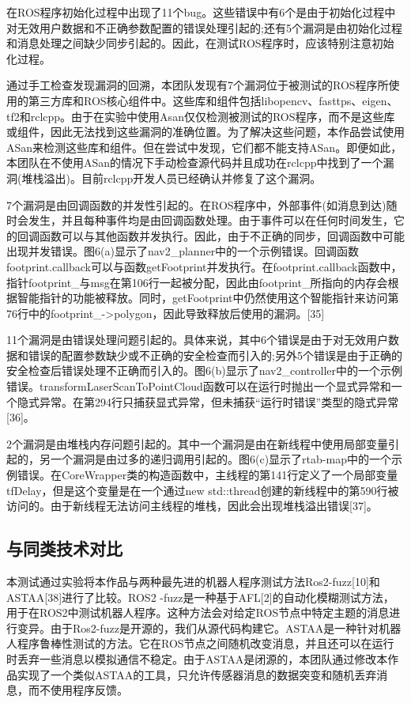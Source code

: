 在ROS程序初始化过程中出现了11个bug。这些错误中有6个是由于初始化过程中对无效用户数据和不正确参数配置的错误处理引起的;还有5个漏洞是由初始化过程和消息处理之间缺少同步引起的。因此，在测试ROS程序时，应该特别注意初始化过程。

通过手工检查发现漏洞的回溯，本团队发现有7个漏洞位于被测试的ROS程序所使用的第三方库和ROS核心组件中。这些库和组件包括libopencv、fasttps、eigen、tf2和rclcpp。由于在实验中使用Asan仅仅检测被测试的ROS程序，而不是这些库或组件，因此无法找到这些漏洞的准确位置。为了解决这些问题，本作品尝试使用ASan来检测这些库和组件。但在尝试中发现，它们都不能支持ASan。即便如此，本团队在不使用ASan的情况下手动检查源代码并且成功在rclcpp中找到了一个漏洞(堆栈溢出)。目前rclcpp开发人员已经确认并修复了这个漏洞。

7个漏洞是由回调函数的并发性引起的。在ROS程序中，外部事件(如消息到达)随时会发生，并且每种事件均是由回调函数处理。由于事件可以在任何时间发生，它的回调函数可以与其他函数并发执行。因此，由于不正确的同步，回调函数中可能出现并发错误。图6(a)显示了nav2\_planner中的一个示例错误。回调函数footprint.callback可以与函数getFootprint并发执行。在footprint.callback函数中，指针footprint\_与msg在第106行一起被分配，因此由footprint\_所指向的内存会根据智能指针的功能被释放。同时，getFootprint中仍然使用这个智能指针来访问第76行中的footprint\_-\textgreater polygon，因此导致释放后使用的漏洞。{[}35{]}

11个漏洞是由错误处理问题引起的。具体来说，其中6个错误是由于对无效用户数据和错误的配置参数缺少或不正确的安全检查而引入的;另外5个错误是由于正确的安全检查后错误处理不正确而引入的。图6(b)显示了nav2\_controller中的一个示例错误。transformLaserScanToPointCloud函数可以在运行时抛出一个显式异常和一个隐式异常。在第294行只捕获显式异常，但未捕获``运行时错误''类型的隐式异常{[}36{]}。

2个漏洞是由堆栈内存问题引起的。其中一个漏洞是由在新线程中使用局部变量引起的，另一个漏洞是由过多的递归调用引起的。图6(c)显示了rtab-map中的一个示例错误。在CoreWrapper类的构造函数中，主线程的第141行定义了一个局部变量tfDelay，但是这个变量是在一个通过new
std::thread创建的新线程中的第590行被访问的。由于新线程无法访问主线程的堆栈，因此会出现堆栈溢出错误{[}37{]}。

\subsection{与同类技术对比}
本测试通过实验将本作品与两种最先进的机器人程序测试方法Ros2-fuzz{[}10{]}和ASTAA{[}38{]}进行了比较。ROS2
-fuzz是一种基于AFL{[}2{]}的自动化模糊测试方法，用于在ROS2中测试机器人程序。这种方法会对给定ROS节点中特定主题的消息进行变异。由于Ros2-fuzz是开源的，我们从源代码构建它。ASTAA是一种针对机器人程序鲁棒性测试的方法。它在ROS节点之间随机改变消息，并且还可以在运行时丢弃一些消息以模拟通信不稳定。由于ASTAA是闭源的，本团队通过修改本作品实现了一个类似ASTAA的工具，只允许传感器消息的数据突变和随机丢弃消息，而不使用程序反馈。


